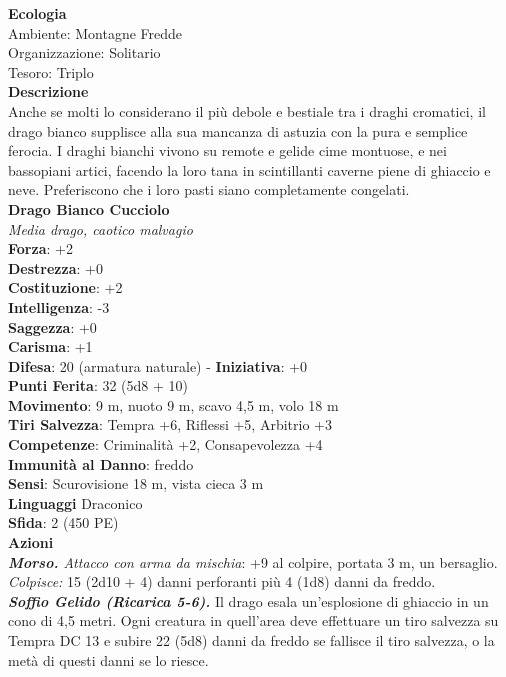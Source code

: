 \begin{multicols}{2}
\textbf{Ecologia}\\
Ambiente: Montagne Fredde\\
Organizzazione: Solitario\\
Tesoro: Triplo\\
\textbf{Descrizione}\\
Anche se molti lo considerano il più debole e bestiale tra i draghi cromatici, il drago bianco supplisce alla sua mancanza di astuzia con la pura e semplice ferocia. I draghi bianchi vivono su remote e gelide cime montuose, e nei bassopiani artici, facendo la loro tana in scintillanti caverne piene di ghiaccio e neve. Preferiscono che i loro pasti siano completamente congelati.\\


\medskip\textbf{Drago Bianco Cucciolo}\\
\emph{Media drago, caotico malvagio}\\
\textbf{Forza}: +2\\
\textbf{Destrezza}: +0\\
\textbf{Costituzione}: +2\\
\textbf{Intelligenza}: -3\\
\textbf{Saggezza}: +0\\
\textbf{Carisma}: +1\\
\textbf{Difesa}: 20 (armatura naturale) - \textbf{Iniziativa}: +0\\
\textbf{Punti Ferita}: 32 (5d8 + 10)\\
\textbf{Movimento}: 9 m, nuoto 9 m, scavo 4,5 m, volo 18 m\\
\textbf{Tiri Salvezza}: Tempra +6, Riflessi +5, Arbitrio +3\\
\textbf{Competenze}: Criminalità +2, Consapevolezza +4\\
\textbf{Immunità al Danno}: freddo\\
\textbf{Sensi}: Scurovisione 18 m, vista cieca 3 m\\
\textbf{Linguaggi} Draconico\\
\textbf{Sfida}: 2 (450 PE)\smallskip\\
\smallskip\textbf{Azioni}\\
\emph{\textbf{Morso.} Attacco con arma da mischia}: +9 al colpire, portata 3 m, un bersaglio.\\
\emph{Colpisce:} 15 (2d10 + 4) danni perforanti più 4 (1d8) danni da freddo.\\
\emph{\textbf{Soffio Gelido (Ricarica 5-6).}} Il drago esala un'esplosione di ghiaccio in un cono di 4,5 metri. Ogni creatura in quell'area deve effettuare un tiro salvezza su Tempra DC  13 e subire 22 (5d8) danni da freddo se fallisce il tiro salvezza, o la metà di questi danni se lo riesce.

\end{multicols}
